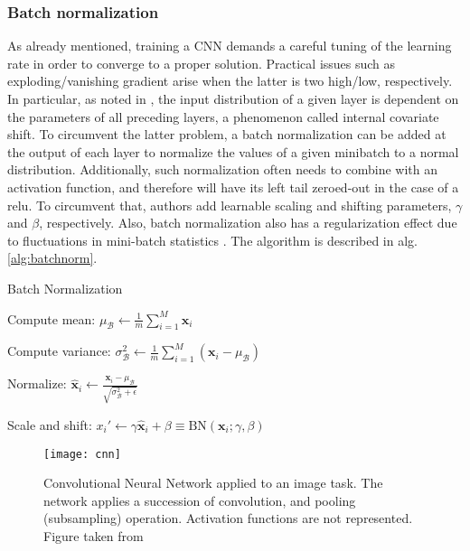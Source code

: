 \subsubsection{Batch normalization}
As already mentioned, training a CNN demands a careful tuning of the learning rate in order to converge to a proper solution.
Practical issues such as exploding/vanishing gradient arise when the latter is two high/low, respectively.
In particular, as noted in \cite{ioffe15}, the input distribution of a given layer is dependent on the parameters of all preceding layers, a phenomenon called internal covariate shift.
To circumvent the latter problem, a batch normalization can be added at the output of each layer to normalize the values of a given minibatch to a normal distribution.
Additionally, such normalization often needs to combine with an activation function, and therefore will have its left tail zeroed-out in the case of a \gls{relu}.
To circumvent that, authors add learnable scaling and shifting parameters, $\gamma$ and $\beta$, respectively.
Also, batch normalization also has a regularization effect due to fluctuations in mini-batch statistics \cite{gastaldi17}.
The algorithm is described in alg. \ref{alg:batchnorm}.

\begin{algorithm}[H]
  \label{alg:batchnorm}
 \caption{Batch Normalization}
 \begin{algorithmic}[1]
    \State Compute mean: $\mu_{\mathcal{B}}\leftarrow \frac{1}{m}\sum_{i=1}^{M}\bm{x}_{i}$

    \State Compute variance: $\sigma^{2}_{\mathcal{B}}\leftarrow \frac{1}{m}\sum_{i=1}^{M}(\bm{x}_{i}-\mu_{\mathcal{B}})$

    \State Normalize: $\hat{\bm{x}}_{i}\leftarrow \frac{\bm{x}_{i}-\mu_{\mathcal{B}}}{\sqrt{\sigma^{2}_{\mathcal{B}} + \epsilon}}$

    \State Scale and shift: $x_{i}'\leftarrow \gamma \hat{\bm{x}}_{i} + \beta \equiv \text{BN}(\bm{x}_{i};\gamma,\beta)$

 \end{algorithmic}
\end{algorithm}

\begin{figure}[!htpb]
  \centering
  \texttt{[image: cnn]}
  \caption{Convolutional Neural Network applied to an image task.
    The network applies a succession of convolution, and pooling (subsampling) operation.
  Activation functions are not represented. Figure taken from \cite{lecun95}}
  \label{fig:cnn}
\end{figure}

